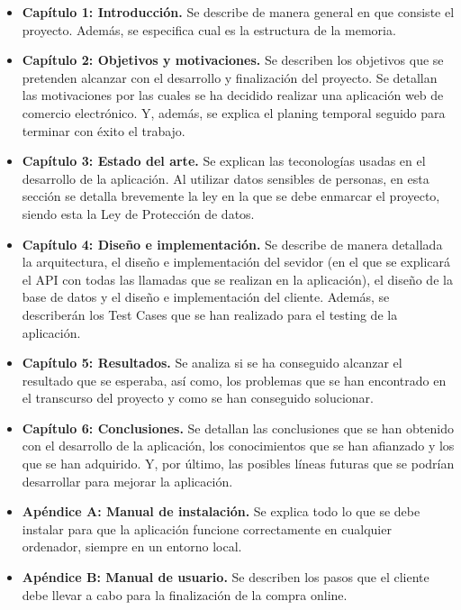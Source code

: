 \documentclass[a4paper, 12pt]{book}
\begin{document}
\begin{itemize}
  \item \textbf{Capítulo 1: Introducción.} Se describe de manera general en que consiste el proyecto. Además, se especifica cual es la estructura de la memoria.  
  
  \item \textbf{Capítulo 2: Objetivos y motivaciones.} Se describen los objetivos que se pretenden alcanzar con el desarrollo y finalización del proyecto. Se detallan las motivaciones por las cuales se ha decidido realizar una aplicación web de comercio electrónico. Y, además, se explica el planing temporal seguido para terminar con éxito el trabajo. 
  
  \item \textbf{Capítulo 3: Estado del arte.} Se explican las teconologías usadas en el desarrollo de la aplicación. Al utilizar datos sensibles de personas, en esta sección se detalla brevemente la ley en la que se debe enmarcar el proyecto, siendo esta la Ley de Protección de datos.

  \item \textbf{Capítulo 4: Diseño e implementación.} Se describe de manera detallada la arquitectura, el diseño e implementación del sevidor (en el que se explicará el API con todas las llamadas que se realizan en la aplicación), el diseño de la base de datos y el diseño e implementación del cliente. Además, se describerán los Test Cases que se han realizado para el testing de la aplicación. 

  \item \textbf{Capítulo 5: Resultados.} Se analiza si se ha conseguido alcanzar el resultado que se esperaba, así como, los problemas que se han encontrado en el transcurso del proyecto y como se han conseguido solucionar. 

  \item \textbf{Capítulo 6: Conclusiones.} Se detallan las conclusiones que se han obtenido con el desarrollo de la aplicación, los conocimientos que se han afianzado y los que se han adquirido. Y, por último, las posibles líneas futuras que se podrían desarrollar para mejorar la aplicación. 

  \item \textbf{Apéndice A: Manual de instalación.} Se explica todo lo que se debe instalar para que la aplicación funcione correctamente en cualquier ordenador, siempre en un entorno  local. 

  \item \textbf{Apéndice B: Manual de usuario.} Se describen los pasos que el cliente debe llevar a cabo para la finalización de la compra online. 
  
\end{itemize}
\end{document}
